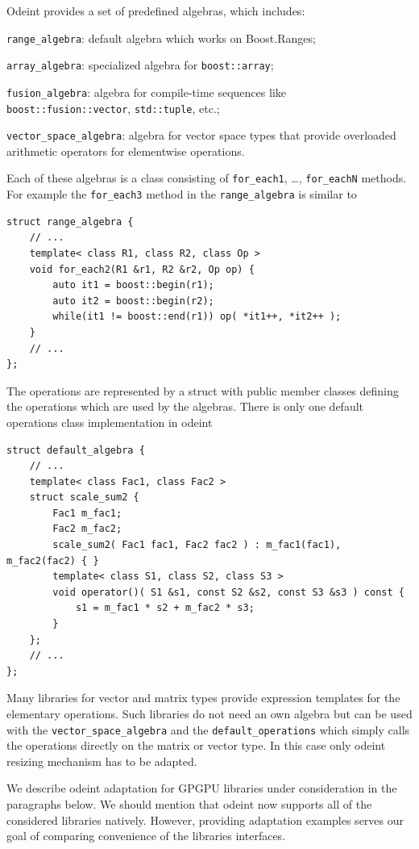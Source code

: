 \documentclass[final]{siamltex}
\newcommand{\code}[1]{\lstinline|#1|}
\begin{document}
Odeint provides a set of predefined algebras, which includes:
\begin{remunerate}
\item \code{range_algebra}: default algebra which works on Boost.Ranges;
\item \code{array_algebra}: specialized algebra for \code{boost::array};
\item \code{fusion_algebra}: algebra for compile-time sequences like
  \code{boost::fusion::vector}, \code{std::tuple}, etc.;
\item \code{vector_space_algebra}: algebra for vector space types that
  provide overloaded arithmetic operators for elementwise operations.
\end{remunerate}
Each of these algebras is a class consisting of \code{for_each1},
\dots, \code{for_eachN} methods. For example the \code{for_each3}
method in the \code{range_algebra} is similar to
\begin{lstlisting}
struct range_algebra {
    // ...
    template< class R1, class R2, class Op >
    void for_each2(R1 &r1, R2 &r2, Op op) {
        auto it1 = boost::begin(r1);
        auto it2 = boost::begin(r2);
        while(it1 != boost::end(r1)) op( *it1++, *it2++ );
    }
    // ...
};
\end{lstlisting}
The operations are represented by a struct with public member classes defining the
operations which are used by the algebras. There is only one default
operations class implementation in odeint
\begin{lstlisting}
struct default_algebra {
    // ...
    template< class Fac1, class Fac2 >
    struct scale_sum2 {
        Fac1 m_fac1;
        Fac2 m_fac2;
        scale_sum2( Fac1 fac1, Fac2 fac2 ) : m_fac1(fac1), m_fac2(fac2) { }
        template< class S1, class S2, class S3 >
        void operator()( S1 &s1, const S2 &s2, const S3 &s3 ) const {
            s1 = m_fac1 * s2 + m_fac2 * s3;
        }
    };
    // ...
};
\end{lstlisting}


Many libraries for vector and matrix types provide expression
templates for the elementary operations. Such libraries do not need an
own algebra but can be used with the \code{vector_space_algebra} and
the \code{default_operations} which simply calls the operations
directly on the matrix or vector type. In this case only odeint
resizing mechanism has to be adapted.

We describe odeint adaptation for GPGPU libraries under consideration
in the paragraphs below. We should mention that odeint now supports
all of the considered libraries natively. However, providing
adaptation examples serves our goal of comparing convenience of the
libraries interfaces.
\end{document}
